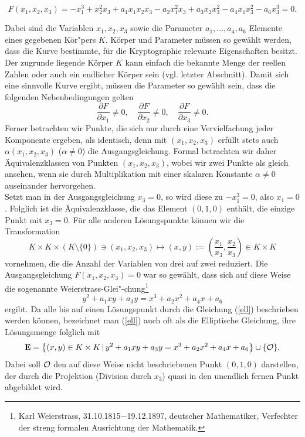 \begin{refsegment}
\begin{equation}
 F(x_1,x_2,x_3)=-x_1^3+x_2^2x_3+a_1x_1x_2x_3-a_2x_1^2x_3+a_3x_2x_3^2-a_4x_1x_3^2-a_6x_3^3=0.
\label{eccbasisgleichung}
\end{equation}

Dabei sind die Variablen $x_1,x_2,x_3$ sowie die Parameter $a_1,\dots,a_4,a_6$ Elemente eines gegebenen Kör"pers $K$. Körper und Parameter müssen so gewählt werden, dass die Kurve bestimmte, für die Kryptographie relevante Eigenschaften besitzt. Der zugrunde liegende Körper $K$ kann einfach die bekannte Menge der reellen Zahlen oder auch ein endlicher Körper sein (vgl. letzter Abschnitt).
Damit sich eine sinnvolle Kurve ergibt, müssen die Parameter so gewählt sein, dass die folgenden Nebenbedingungen gelten
$$ \frac{\partial F}{\partial x_1}\ne 0, \quad \frac{\partial F}{\partial x_2}\ne 0, \quad
\frac{\partial F}{\partial x_3}\ne 0 .
$$
Ferner betrachten wir Punkte, die sich nur durch eine Vervielfachung jeder Komponente ergeben, als identisch, denn mit $(x_1,x_2,x_3)$ erfüllt stets auch $\alpha (x_1,x_2,x_3)$ ($\alpha\ne 0$) die Ausgangsgleichung. Formal betrachten wir daher Äquivalenzklassen von Punkten $(x_1,x_2,x_3)$, wobei wir zwei Punkte als gleich ansehen, wenn sie durch Multiplikation mit einer skalaren Konstante $\alpha \ne 0$ auseinander hervorgehen.
\\ Setzt man in der Ausgangsgleichung $x_3=0$, so wird diese zu $-x_1^3=0$, also $x_1=0$. Folglich ist die Äquivalenzklasse, die das Element $(0,1,0)$ enthält, die einzige Punkt mit $x_3=0$. Für alle anderen Lösungspunkte können wir die Transformation
$$ K\times K\times (K\setminus\{0\})\ni (x_1,x_2,x_3) \mapsto (x,y):=\left( \frac{x_1}{x_3}, \frac{x_2}{x_3}\right) \in K\times K
$$
vornehmen, die die Anzahl der Variablen von drei auf zwei reduziert.
Die Ausgangsgleichung $F(x_1,x_2,x_3)=0$ war so gewählt, dass sich auf
diese Weise die sogenannte Weierstrass-Glei"-chung\footnote{%
Karl Weierstrass, 31.10.1815$-$19.12.1897, deutscher Mathematiker,
Verfechter der streng formalen Ausrichtung der Mathematik.
}
\begin{equation}
 y^2+a_1xy+a_3y = x^3+a_2x^2+a_4x+a_6
\label{ell}
\end{equation}
ergibt.
Da alle bis auf einen Lösungspunkt durch die Gleichung (\ref{ell}) beschrieben werden können, bezeichnet man (\ref{ell}) auch oft als die Elliptische Gleichung, ihre Lösungsmenge folglich mit
$$ \textbf{E} = \left\{(x,y)\in K\times K \, |\, y^2+a_1xy+a_3y = x^3+a_2x^2+a_4x+a_6  \right\} \cup \{{\cal O} \}.
$$
Dabei soll ${\cal O}$ den auf diese Weise nicht beschriebenen Punkt $(0,1,0)$ darstellen, der durch die Projektion (Division durch $x_3$) quasi in den unendlich fernen Punkt abgebildet wird.


\end{refsegment}
